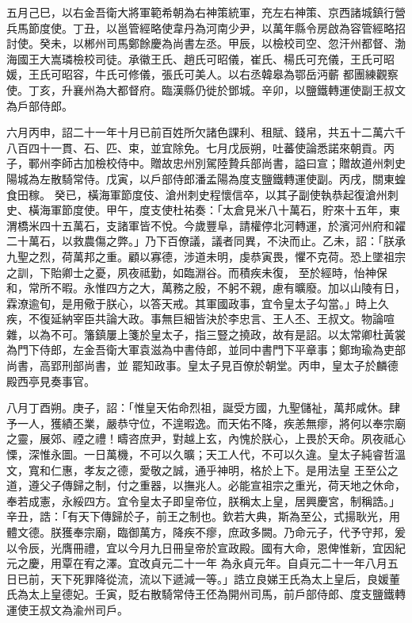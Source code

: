 \begin{pinyinscope}
 五月己巳，以右金吾衛大將軍範希朝為右神策統軍，充左右神策、京西諸城鎮行營兵馬節度使。丁丑，以邕管經略使韋丹為河南少尹，以萬年縣令房啟為容管經略招討使。癸未，以郴州司馬鄭餘慶為尚書左丞。甲辰，以檢校司空、忽汗州都督、渤海國王大嵩璘檢校司徒。承徽王氏、趙氏可昭儀，崔氏、楊氏可充儀，王氏可昭媛，王氏可昭容，牛氏可修儀，張氏可美人。以右丞韓皋為鄂岳沔蘄
 都團練觀察使。丁亥，升襄州為大都督府。臨漢縣仍徙於鄧城。辛卯，以鹽鐵轉運使副王叔文為戶部侍郎。



 六月丙申，詔二十一年十月已前百姓所欠諸色課利、租賦、錢帛，共五十二萬六千八百四十一貫、石、匹、束，並宜除免。七月戊辰朔，吐蕃使論悉諾來朝貢。丙子，鄆州李師古加檢校侍中。贈故忠州別駕陸贄兵部尚書，謚曰宣；贈故道州刺史陽城為左散騎常侍。戊寅，以戶部侍郎潘孟陽為度支鹽鐵轉運使副。丙戌，關東蝗食田稼。
 癸已，橫海軍節度伎、滄州刺史程懷信卒，以其子副使執恭起復滄州刺史、橫海軍節度使。甲午，度支使杜祐奏：「太倉見米八十萬石，貯來十五年，東渭橋米四十五萬石，支諸軍皆不悅。今歲豐阜，請權停北河轉運，於濱河州府和糴二十萬石，以救農傷之弊。」乃下百僚議，議者同異，不決而止。乙未，詔：「朕承九聖之烈，荷萬邦之重。顧以寡德，涉道未明，虔恭寅畏，懼不克荷。恐上墜祖宗之訓，下貽卿士之憂，夙夜祗勤，如臨淵谷。而積疾未復，
 至於經時，怡神保和，常所不暇。永惟四方之大，萬務之殷，不躬不親，慮有曠廢。加以山陵有日，霖潦逾旬，是用儆于朕心，以答天戒。其軍國政事，宜令皇太子勾當。」時上久疾，不復延納宰臣共論大政。事無巨細皆決於李忠言、王人丕、王叔文。物論喧雜，以為不可。籓鎮屢上箋於皇太子，指三豎之撓政，故有是詔。以太常卿杜黃裳為門下侍郎，左金吾衛大軍袁滋為中書侍郎，並同中書門下平章事；鄭珣瑜為吏部尚書，高郢刑部尚書，並
 罷知政事。皇太子見百僚於朝堂。丙申，皇太子於麟德殿西亭見奏事官。



 八月丁酉朔。庚子，詔：「惟皇天佑命烈祖，誕受方國，九聖儲祉，萬邦咸休。肆予一人，獲績丕業，嚴恭守位，不遑暇逸。而天佑不降，疾恙無瘳，將何以奉宗廟之靈，展郊、禋之禮！疇咨庶尹，對越上玄，內愧於朕心，上畏於天命。夙夜祗心慄，深惟永圖。一日萬機，不可以久曠；天工人代，不可以久違。皇太子純睿哲溫文，寬和仁惠，孝友之德，愛敬之誠，通乎神明，格於上下。是用法皇
 王至公之道，遵父子傳歸之制，付之重器，以撫兆人。必能宣祖宗之重光，荷天地之休命，奉若成憲，永綏四方。宜令皇太子即皇帝位，朕稱太上皇，居興慶宮，制稱誥。」辛丑，誥：「有天下傳歸於子，前王之制也。欽若大典，斯為至公，式揚耿光，用體文德。朕獲奉宗廟，臨御萬方，降疾不瘳，庶政多闕。乃命元子，代予守邦，爰以令辰，光膺冊禮，宜以今月九日冊皇帝於宣政殿。國有大命，恩俾惟新，宜因紀元之慶，用覃在宥之澤。宜改貞元二十一年
 為永貞元年。自貞元二十一年八月五日已前，天下死罪降從流，流以下遞減一等。」誥立良娣王氏為太上皇后，良媛董氏為太上皇德妃。壬寅，貶右散騎常侍王伾為開州司馬，前戶部侍郎、度支鹽鐵轉運使王叔文為渝州司戶。




\end{pinyinscope}
